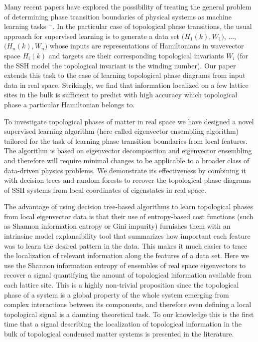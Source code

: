 \documentclass[10pt]{revtex4-1}
\begin{document}
Many recent papers have explored the possibility of treating the general problem of determining phase transition boundaries of physical systems as machine learning tasks \cite{carrasquilla2017machine}$^-$\cite{rodriguez2018identifying}. In the particular case of topological phase transitions, the usual approach for supervised learning is to generate a data set $\big(H_1(k), W_1\big)$, ..., $\big(H_n(k), W_n\big)$ whose inputs are representations of Hamiltonians in wavevector space $H_i(k)$ and targets are their corresponding topological invariants $W_i$ (for the SSH model the topological invariant is the winding number). Our paper extends this task to the case of learning topological phase diagrams from input data in real space. Strikingly, we find that information localized on a few lattice sites in the bulk is sufficient to predict with high accuracy which topological phase a particular Hamiltonian belongs to.

To investigate topological phases of matter in real space we have designed a novel supervised learning algorithm (here called eigenvector ensembling algorithm) tailored for the task of learning phase transition boundaries from local features. The algorithm is based on eigenvector decomposition and eigenvector ensembling and therefore will require minimal changes to be applicable to a broader class of data-driven physics problems. We demonstrate its effectiveness by combining it with decision trees and random forests to recover the topological phase diagrams of SSH systems from local coordinates of eigenstates in real space.

The advantage of using decision tree-based algorithms to learn topological phases from local eigenvector data is that their use of entropy-based cost functions (such as Shannon information entropy or Gini impurity) furnishes them with an intrinsinc model explanaibility tool that summarizes how important each feature was to learn the desired pattern in the data. This makes it much easier to trace the localization of relevant information along the features of a data set. Here we use the Shannon information entropy of ensembles of real space eigenvectors to recover a signal quantifying the amount of topological information available from each lattice site. This is a highly non-trivial proposition since the topological phase of a system is a global property of the whole system emerging from complex interactions between its components, and therefore even defining a local topological signal is a daunting theoretical task. To our knowledge this is the first time that a signal describing the localization of topological information in the bulk of topological condensed matter systems is presented in the literature.
\end{document}

